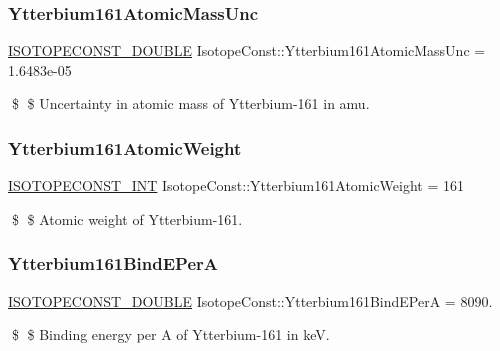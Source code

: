 \subsubsection{\texorpdfstring{Ytterbium161\+Atomic\+Mass\+Unc}{Ytterbium161AtomicMassUnc}}
{\footnotesize\ttfamily \mbox{\hyperlink{group___isotope_const-_macros_ga8f45a7272ce02c0b4c65c44636ed719a}{I\+S\+O\+T\+O\+P\+E\+C\+O\+N\+S\+T\+\_\+\+D\+O\+U\+B\+LE}} Isotope\+Const\+::\+Ytterbium161\+Atomic\+Mass\+Unc = 1.\+6483e-\/05}

\$ \$ Uncertainty in atomic mass of Ytterbium-\/161 in amu. \mbox{\label{group___isotope_const-_ytterbium-_yb161_ga65c443a1c93be452001512140ecb680c}} 
\subsubsection{\texorpdfstring{Ytterbium161\+Atomic\+Weight}{Ytterbium161AtomicWeight}}
{\footnotesize\ttfamily \mbox{\hyperlink{group___isotope_const-_macros_ga5f18360b3e99483a35c32d789e62621c}{I\+S\+O\+T\+O\+P\+E\+C\+O\+N\+S\+T\+\_\+\+I\+NT}} Isotope\+Const\+::\+Ytterbium161\+Atomic\+Weight = 161}

\$ \$ Atomic weight of Ytterbium-\/161. \mbox{\label{group___isotope_const-_ytterbium-_yb161_ga75974a92e61a79e6ebe82666055e9e82}} 
\subsubsection{\texorpdfstring{Ytterbium161\+Bind\+E\+PerA}{Ytterbium161BindEPerA}}
{\footnotesize\ttfamily \mbox{\hyperlink{group___isotope_const-_macros_ga8f45a7272ce02c0b4c65c44636ed719a}{I\+S\+O\+T\+O\+P\+E\+C\+O\+N\+S\+T\+\_\+\+D\+O\+U\+B\+LE}} Isotope\+Const\+::\+Ytterbium161\+Bind\+E\+PerA = 8090.}

\$ \$ Binding energy per A of Ytterbium-\/161 in keV. \mbox{\label{group___isotope_const-_ytterbium-_yb161_ga8f271ddc45841b9b5ceca62d2ef98d5d}} 
